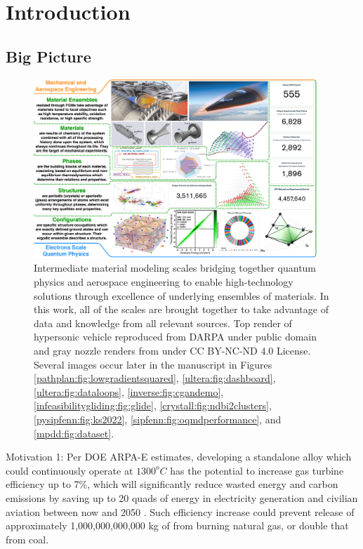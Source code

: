 \chapter{Introduction} \label{sec:Introduction}

\section{Big Picture} \label{intro:sec:bigpicture}

\todo

\begin{figure}[H]
    \centering
    \includegraphics[width=0.95\textwidth]{intro/DissertationBigPicture.png}
    \caption{
    Intermediate material modeling scales bridging together quantum physics and aerospace engineering to enable high-technology solutions through excellence of underlying ensembles of materials. In this work, all of the scales are brought together to take advantage of data and knowledge from all relevant sources. Top render of hypersonic vehicle reproduced from DARPA under public domain and gray nozzle renders from \cite{Hofmann2014DevelopingManufacturing} under CC BY-NC-ND 4.0 License. Several images occur later in the manuscript in Figures \ref{pathplan:fig:lowgradientsquared}, \ref{ultera:fig:dashboard}, \ref{ultera:fig:dataloops}, \ref{inverse:fig:cgandemo}, \ref{infeasibilitygliding:fig:glide}, \ref{crystall:fig:ndbi2clusters}, \ref{pysipfenn:fig:ks2022}, \ref{sipfenn:fig:oqmdperformance}, and \ref{mpdd:fig:dataset}.
    }
    \label{intro:fig:bigpicture}
\end{figure}

Motivation 1:
Per DOE ARPA-E estimates, developing a standalone alloy which could continuously operate at $1300^oC$ has the potential to increase gas turbine efficiency up to 7\%, which will significantly reduce wasted energy and carbon emissions by saving up to 20 quads of energy in electricity generation and civilian aviation between now and 2050 \cite{ULTIMATEArpa-e.energy.gov}. Such efficiency increase could prevent release of approximately 1,000,000,000,000 kg of  from burning natural gas, or double that from coal.

